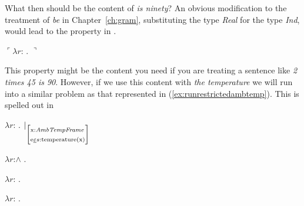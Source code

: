 What then should be the content of \textit{is ninety}?  An obvious
modification to the treatment of \textit{be} in Chapter~\ref{ch:gram}, substituting the type \textit{Real} for the type \textit{Ind},
would lead to the property in \nexteg{}.
\begin{ex} 
$\ulcorner\lambda r$:
. $\urcorner$ 
\end{ex} 
This property might be the content you need if you are treating a sentence like
\textit{2 times 45 is 90}.  However, if we use this content with
\textit{the temperature} we will run into a similar problem as that
represented in (\ref{ex:runrestrictedambtemp}).  This is spelled out in \nexteg{}
\begin{ex} 
\begin{subex} 
 
\item $\lambda r$: . 
            $|_\text{\smallrecord{\smalltfield{x}{\textit{AmbTempFrame}}\\
        \smallrfield{e}{$s$}{temperature(x)}}}$ 
 
\item $\lambda r$:\d{$\wedge$} . 

\item $\lambda
  r$: . 

\item $\lambda
  r$: . 


 
\end{subex} 
   
\end{ex}  
